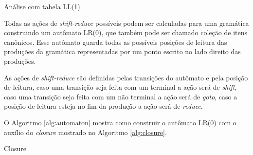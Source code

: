 \begin{algorithm}[htp]
\caption{Análise com tabela LL(1)}\label{alg:lltparse}
\end{algorithm}
Todas as ações de \textit{shift-reduce} possíveis podem ser calculadas para uma gramática construindo um autômato LR(0), que também pode ser chamado coleção de itens canônicos. Esse autômato guarda todas as possíveis posições de leitura das produções da gramática representadas por um ponto escrito no lado direito das produções.

As ações de \textit{shift-reduce} são definidas pelas transições do autômato e pela posição de leitura, caso uma transição seja feita com um terminal a ação será de \textit{shift}, caso uma transição seja feita com um não terminal a ação será de \textit{goto}, caso a posição de leitura esteja no fim da produção a ação será de \textit{reduce}. 

O Algoritmo \ref{alg:automaton} mostra como construir o autômato LR(0) com o auxílio do \textit{closure} mostrado no Algoritmo \ref{alg:closure}.

\begin{algorithm}[ht]
    \caption{Closure}\label{alg:closure}
\end{algorithm}


